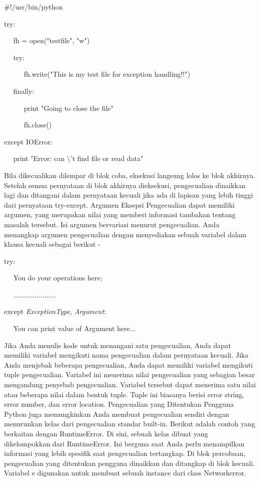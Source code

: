  $  \#  $!/usr/bin/python 
\vspace{12pt}
 
try: 

~~ fh = open("testfile", "w") 

~~ try: 
 
~~~~~ fh.write("This is my test file for exception handling!!") 

~~ finally: 

~~~~~ print "Going to close the file" 

~~~~~ fh.close() 

except IOError: 

~~ print "Error: can $  \setminus  $'t find file or read data" 
\vspace{12pt}
\vspace{16pt}

 \hspace*{0.5in} Bila dikecualikan dilempar di blok coba, eksekusi langsung lolos ke blok akhirnya. Setelah semua pernyataan di blok akhirnya dieksekusi, pengecualian dinaikkan lagi dan ditangani dalam pernyataan kecuali jika ada di lapisan yang lebih tinggi dari pernyataan try-except. Argumen Eksepsi Pengecualian dapat memiliki argumen, yang merupakan nilai yang memberi informasi tambahan tentang masalah tersebut. Isi argumen bervariasi menurut pengecualian. Anda menangkap argumen pengecualian dengan menyediakan sebuah variabel dalam klausa kecuali sebagai berikut - 
\vspace{12pt}

try: 

~~ You do your operations here;

~~ ...................... 

except \textit{ExceptionType}\textit{,}\textit{ }\textit{Argument}: 

~~ You can print value of Argument here... 
\vspace{12pt}

 \hspace*{0.5in} Jika Anda menulis kode untuk menangani satu pengecualian, Anda dapat memiliki variabel mengikuti nama pengecualian dalam pernyataan kecuali. Jika Anda menjebak beberapa pengecualian, Anda dapat memiliki variabel mengikuti tuple pengecualian. Variabel ini menerima nilai pengecualian yang sebagian besar mengandung penyebab pengecualian. Variabel tersebut dapat menerima satu nilai atau beberapa nilai dalam bentuk tuple. Tuple ini biasanya berisi error string, error number, dan error location. Pengecualian yang Ditentukan Pengguna Python juga memungkinkan Anda membuat pengecualian sendiri dengan menurunkan kelas dari pengecualian standar built-in. Berikut adalah contoh yang berkaitan dengan RuntimeError. Di sini, sebuah kelas dibuat yang dikelompokkan dari RuntimeError. Ini berguna saat Anda perlu menampilkan informasi yang lebih spesifik saat pengecualian tertangkap. Di blok percobaan, pengecualian yang ditentukan pengguna dinaikkan dan ditangkap di blok kecuali. Variabel e digunakan untuk membuat sebuah instance dari class Networkerror. 
\vspace{12pt}

